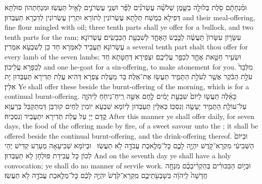 {וּמִ֨נְחָתָ֔ם סֹ֖לֶת בְּלוּלָ֣ה בַשָּׁ֑מֶן שְׁלֹשָׁ֨ה עֶשְׂרֹנִ֜ים לַפָּ֗ר וּשְׁנֵ֧י עֶשְׂרֹנִ֛ים לָאַ֖יִל תַּעֲשֽׂוּ׃}
{וּמִנְחָתְהוֹן סוּלְתָּא דְּפִילָא בִמְשַׁח תְּלָתָא עֶשְׂרוֹנִין לְתוֹרָא וּתְרֵין עֶשְׂרוֹנִין לְדִכְרָא תַּעְבְּדוּן׃}
{and their meal-offering, fine flour mingled with oil; three tenth parts shall ye offer for a bullock, and two tenth parts for the ram;}{}
{עִשָּׂר֤וֹן עִשָּׂרוֹן֙ תַּעֲשֶׂ֔ה לַכֶּ֖בֶשׂ הָאֶחָ֑ד לְשִׁבְעַ֖ת הַכְּבָשִֽׂים׃}
{עֶשְׂרוֹנָא עֶשְׂרוֹנָא תַּעֲבֵיד לְאִמְּרָא חַד כֵּן לְשִׁבְעָא אִמְּרִין׃}
{a several tenth part shalt thou offer for every lamb of the seven lambs;}{}
{וּשְׂעִ֥יר חַטָּ֖את אֶחָ֑ד לְכַפֵּ֖ר עֲלֵיכֶֽם׃}
{וּצְפִירָא דְּחַטָּתָא חַד לְכַפָּרָא עֲלֵיכוֹן׃}
{and one he-goat for a sin-offering, to make atonement for you.}{}
{מִלְּבַד֙ עֹלַ֣ת הַבֹּ֔קֶר אֲשֶׁ֖ר לְעֹלַ֣ת הַתָּמִ֑יד תַּעֲשׂ֖וּ אֶת־אֵֽלֶּה׃}
{בָּר מֵעֲלַת צַפְרָא דְּהִיא עֲלַת תְּדִירָא תַּעְבְּדוּן יָת אִלֵּין׃}
{Ye shall offer these beside the burnt-offering of the morning, which is for a continual burnt-offering.}{}
{כָּאֵ֜לֶּה תַּעֲשׂ֤וּ לַיּוֹם֙ שִׁבְעַ֣ת יָמִ֔ים לֶ֛חֶם אִשֵּׁ֥ה רֵֽיחַ־נִיחֹ֖חַ לַיהֹוָ֑ה עַל־עוֹלַ֧ת הַתָּמִ֛יד יֵעָשֶׂ֖ה וְנִסְכּֽוֹ׃
}
{כְּאִלֵּין תַּעְבְּדוּן לְיוֹמָא שִׁבְעָא יוֹמִין לְחֵים קוּרְבַּן דְּמִתְקַבַּל בְּרַעֲוָא קֳדָם יְיָ עַל עֲלַת תְּדִירָא יִתְעֲבֵיד וְנִסְכֵּיהּ׃}
{After this manner ye shall offer daily, for seven days, the food of the offering made by fire, of a sweet savour unto the \lord; it shall be offered beside the continual burnt-offering, and the drink-offering thereof.}{}
{וּבַיּוֹם֙ הַשְּׁבִיעִ֔י מִקְרָא־קֹ֖דֶשׁ יִהְיֶ֣ה לָכֶ֑ם כׇּל־מְלֶ֥אכֶת עֲבֹדָ֖ה לֹ֥א תַעֲשֽׂוּ׃ \setuma }
{וּבְיוֹמָא שְׁבִיעָאָה מְעָרַע קַדִּישׁ יְהֵי לְכוֹן כָּל עֲבִידַת פּוּלְחָן לָא תַעְבְּדוּן׃}
{And on the seventh day ye shall have a holy convocation; ye shall do no manner of servile work.}{}
{וּבְי֣וֹם הַבִּכּוּרִ֗ים בְּהַקְרִ֨יבְכֶ֜ם מִנְחָ֤ה חֲדָשָׁה֙ לַֽיהֹוָ֔ה בְּשָׁבֻעֹ֖תֵיכֶ֑ם מִֽקְרָא־קֹ֙דֶשׁ֙ יִהְיֶ֣ה לָכֶ֔ם כׇּל־מְלֶ֥אכֶת עֲבֹדָ֖ה לֹ֥א תַעֲשֽׂוּ׃
}
